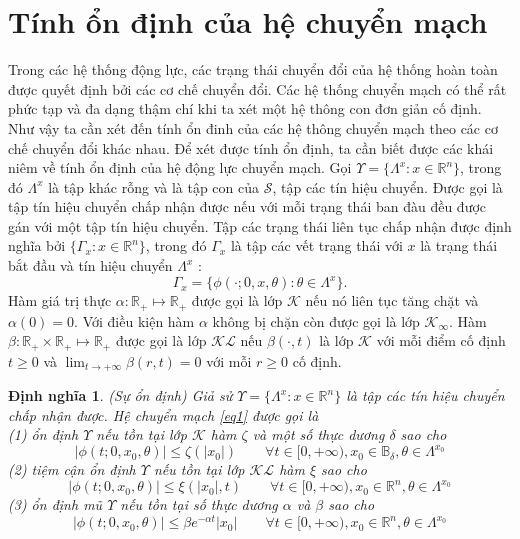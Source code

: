 \documentclass[14pt,a4paper,oneside]{report}		%
\newtheorem{define}[theorem]{Định nghĩa}
\begin{document}
\section{Tính ổn định của hệ chuyển mạch}
Trong các hệ thống động lực, các trạng thái chuyển đổi của hệ thống hoàn toàn được quyết định bởi các cơ chế chuyển đổi. Các hệ thống chuyển mạch có thể rất phức tạp và đa dạng thậm chí khi ta xét một hệ thông con đơn giản cố định. Như vậy ta cần xét đến tính ổn đinh của các hệ thông chuyển mạch theo các cơ chế chuyển đổi khác nhau. Để xét được tính ổn định, ta cần biết được các khái niêm về tính ổn định của hệ động lực chuyển mạch.
Gọi $\Upsilon = \{\Lambda^x:x\in\mathbb{R}^n\}$, trong đó $\Lambda^x$ là tập khác rỗng và là tập con của $\mathcal{S}$, tập các tín hiệu chuyển. Được gọi là tập tín hiệu chuyển chấp nhận được nếu với mỗi trạng thái ban đàu đều được gán với một tập tín hiệu chuyển. Tập các trạng thái liên tục chấp nhận được định nghĩa bởi $\{\Gamma_x:x\in\mathbb{R}^n\}$, trong đó $\Gamma_x$ là tập các vết trạng thái với $x$ là trạng thái bắt đầu và tín hiệu chuyển $\Lambda^x$ :
$$\Gamma_x = \{\phi(\cdot;0,x,\theta):\theta\in\Lambda^x\}.$$
Hàm giá trị thực $\alpha :\mathbb{R}_+ \mapsto \mathbb{R}_+$ được gọi là lớp $\mathcal{K}$ nếu nó liên tục tăng chặt và $\alpha(0)=0$. Với điều kiện hàm $\alpha$ không bị chặn còn được gọi là lớp $\mathcal{K}_\infty$. Hàm $\beta : \mathbb{R}_+ \times \mathbb{R}_+ \mapsto \mathbb{R}_+$ được gọi là lớp $\mathcal{KL}$ nếu $\beta(\cdot,t)$ là lớp $\mathcal{K}$ với mỗi điểm cố định $t \geq 0$ và $\lim_{t\rightarrow +\infty}\beta(r,t)=0$ với mỗi $r\geq 0$ cố định.

\begin{define} \label{def1-1} (Sự ổn định) Giả sử $\Upsilon = \{\Lambda^x:x\in\mathbb{R}^n\}$ là tập các tín hiệu chuyển chấp nhận được. Hệ chuyển mạch \ref{eq1} được gọi là \\
(1) ổn định $\Upsilon$ nếu tồn tại lớp $\mathcal{K}$ hàm $\zeta$ và một số thực dương $\delta$ sao cho
$$|\phi(t;0,x_0,\theta)|\leq\zeta(|x_0|)\qquad\forall t \in [0,+\infty ), x_0 \in\mathbb{B}_\delta , \theta \in\Lambda^{x_0}$$
(2) tiệm cận ổn định $\Upsilon$ nếu tồn tại lớp $\mathcal{KL}$ hàm $\xi$ sao cho
$$|\phi(t;0,x_0,\theta)|\leq\xi(|x_0|,t)\qquad\forall t \in [0,+\infty ), x_0 \in\mathbb{R}^n , \theta \in\Lambda^{x_0}$$
(3) ổn định mũ $\Upsilon$ nếu tồn tại số thực dương $\alpha$ và $\beta$ sao cho
$$|\phi(t;0,x_0,\theta)|\leq \beta e^{-\alpha t}|x_0|\qquad\forall t \in [0,+\infty ), x_0 \in\mathbb{R}^n , \theta \in\Lambda^{x_0}$$
\end{define}
\end{document}
